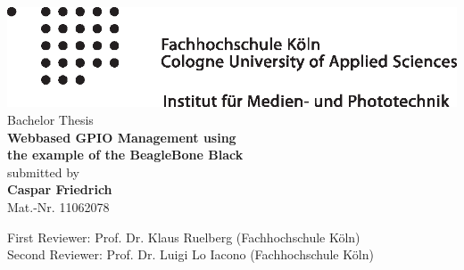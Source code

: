 \begin{otherlanguage}{english}

\begin{titlepage}
\begin{center}

\includegraphics[width = \textwidth]{images/imp_rechts.eps}\\[3cm]

Bachelor Thesis\\[0.5cm]
{\sffamily \bfseries \Huge Webbased GPIO Management using\\[0.25cm]
the example of the BeagleBone Black}\\[2cm]

submitted by\\[0.5cm]
\textbf{Caspar Friedrich}\\[0.5cm]
Mat.-Nr. 11062078\\[0.5cm]

\vfill

First Reviewer: Prof. Dr. Klaus Ruelberg (Fachhochschule Köln)\\[0.5cm]
Second Reviewer: Prof. Dr. Luigi Lo Iacono (Fachhochschule Köln)\\[0.5cm]
\monthname ~\the\year

\end{center}
\end{titlepage}

\end{otherlanguage}
